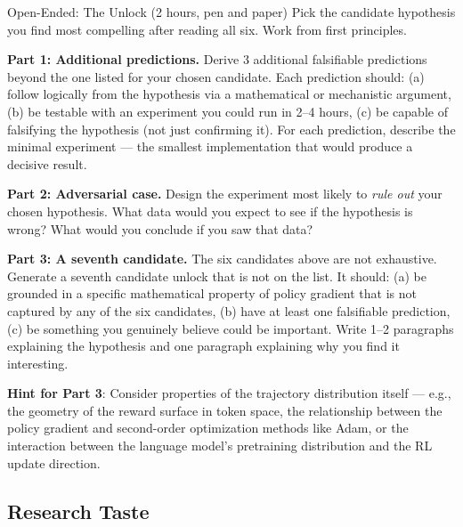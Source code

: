 \begin{exercise}{Open-Ended: The Unlock (2 hours, pen and paper)}
Pick the candidate hypothesis you find most compelling after reading all six. Work from first principles.

\textbf{Part 1: Additional predictions.} Derive 3 additional falsifiable predictions beyond the one listed for your chosen candidate. Each prediction should: (a) follow logically from the hypothesis via a mathematical or mechanistic argument, (b) be testable with an experiment you could run in 2--4 hours, (c) be capable of falsifying the hypothesis (not just confirming it). For each prediction, describe the minimal experiment --- the smallest implementation that would produce a decisive result.

\textbf{Part 2: Adversarial case.} Design the experiment most likely to \textit{rule out} your chosen hypothesis. What data would you expect to see if the hypothesis is wrong? What would you conclude if you saw that data?

\textbf{Part 3: A seventh candidate.} The six candidates above are not exhaustive. Generate a seventh candidate unlock that is not on the list. It should: (a) be grounded in a specific mathematical property of policy gradient that is not captured by any of the six candidates, (b) have at least one falsifiable prediction, (c) be something you genuinely believe could be important. Write 1--2 paragraphs explaining the hypothesis and one paragraph explaining why you find it interesting.

\textbf{Hint for Part 3}: Consider properties of the trajectory distribution itself --- e.g., the geometry of the reward surface in token space, the relationship between the policy gradient and second-order optimization methods like Adam, or the interaction between the language model's pretraining distribution and the RL update direction.
\end{exercise}

\subsection{Research Taste}

